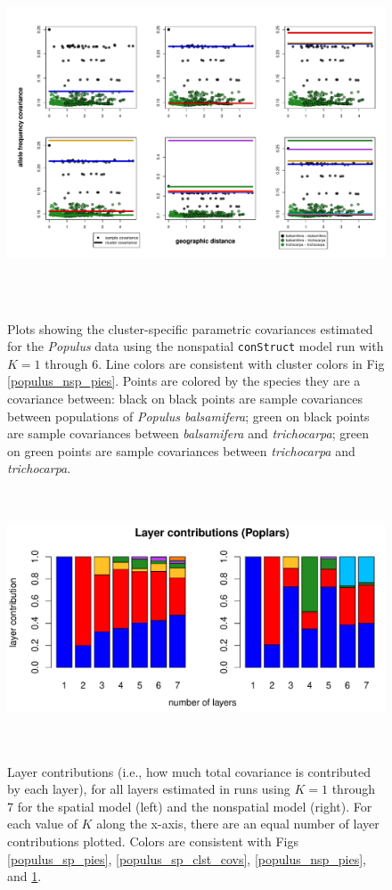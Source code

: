 \documentclass[12pt]{article}
\newcommand{\tri}{\textit{trichocarpa}}
\newcommand{\bals}{\textit{balsamifera}}
\begin{document}
\begin{figure}
	\centering
		{\includegraphics[width=6in,height=4in]{figs/populus/populus_nsp_clst_covs.pdf}}
	\caption{
	Plots showing the cluster-specific parametric covariances 
	estimated for the \textit{Populus} data using 
	the nonspatial \texttt{conStruct} model run with $K=1$ through 6.
	Line colors are consistent with cluster colors in Fig \ref{populus_nsp_pies}.
	Points are colored by the species they are a covariance between:
	black on black points are sample covariances between populations of \textit{Populus balsamifera};
	green on black points are sample covariances between \bals{} and \tri{};
	green on green points are sample covariances between \tri{} and \tri{}.
    }\label{populus_nsp_clst_covs}
\end{figure}

\begin{figure}
	\centering
		{\includegraphics[width=6in,height=3in]{figs/populus/populus_laycon_barplots.pdf}}
	\caption{
	Layer contributions (i.e., how much total covariance is contributed by each layer), 
	for all layers estimated in runs using $K = 1$ through 7 
	for the spatial model (left) and the nonspatial model (right).
	For each value of $K$ along the x-axis, there are an equal number of layer contributions plotted.
	Colors are consistent with Figs \ref{populus_sp_pies}, \ref{populus_sp_clst_covs}, \ref{populus_nsp_pies}, and \ref{populus_nsp_clst_covs}.
    }\label{populus_laycon}
\end{figure}
\end{document}
